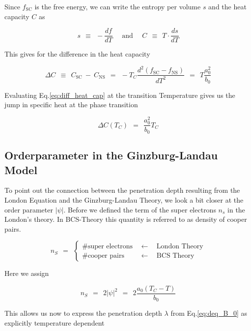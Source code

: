 \documentclass[10pt]{report}
\numberwithin{equation}{chapter}
\newcommand{\myEq}[1]{
  Eq.\ref{#1}
}
\begin{document}
Since $f_\text{SC}$ is the free energy, we can write the entropy per volume $s$ and the heat capacity $C$ as

\begin{equation}
  s ~~\equiv~~ -\frac{df}{dT} ~~~~~~\text{and}~~~~~~ C ~~\equiv~~ T \cdot \frac{ds}{dT}
\end{equation}

This gives for the difference in the heat capacity

\begin{equation} \label{eq:diff_heat_cap}
  \Delta C ~~\equiv~~ C_\text{SC} ~-~ C_\text{NS} ~~=~~ -T_C \frac{d^2(f_\text{SC}-f_\text{NS})}{dT^2} 
  ~~=~~ T \frac{a_0^2}{b_0}
\end{equation}

Evaluating \myEq{eq:diff_heat_cap} at the transition Temperature gives us the jump in specific heat at the phase transition

\begin{equation}
  \Delta C(T_C) ~~=~~ \frac{a_0^2}{b_0} T_C
\end{equation}


\subsection{Orderparameter in the Ginzburg-Landau Model}

To point out the connection between the penetration depth resulting from the London Equation and the Ginzburg-Landau Theory, we look a bit closer at the order parameter $|\psi|$. Before we defined the term of the super electrons $n_s$ in the London's theory. In BCS-Theory this quantity is referred to as density of cooper pairs.

\begin{equation*}
  n_S ~~=~~ \left\{
  \begin{array}{lcr}
    \# \text{super electrons} & ~~\leftarrow~~ & \text{London Theory}\\
    \# \text{cooper pairs}    & ~~\leftarrow~~ & \text{BCS Theory}
  \end{array} \right.
\end{equation*} 


Here we assign 

\begin{equation}
  n_S ~~=~~ 2|\psi|^2 ~~=~~ 2 \frac{a_0(T_C-T)}{b_0}
\end{equation}

This allows us now to express the penetration depth $\lambda$ from \myEq{eq:deq_B_0} as explicitly temperature dependent
\end{document}
